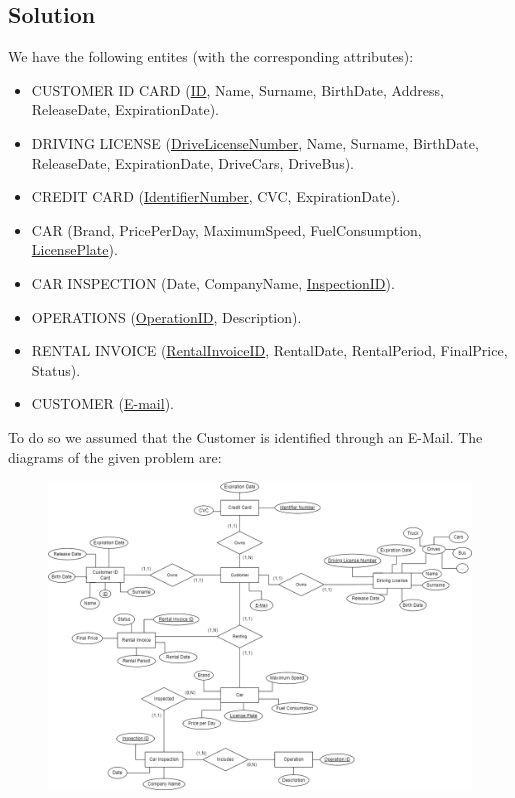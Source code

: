 \subsection{Solution}
We have the following entites (with the corresponding attributes): 
\begin{itemize}
    \item CUSTOMER ID CARD (\underline{ID}, Name, Surname, BirthDate, Address, ReleaseDate, ExpirationDate). 
    \item DRIVING LICENSE (\underline{DriveLicenseNumber}, Name, Surname, BirthDate, ReleaseDate, ExpirationDate, DriveCars, DriveBus). 
    \item CREDIT CARD (\underline{IdentifierNumber}, CVC, ExpirationDate).
    \item CAR (Brand, PricePerDay, MaximumSpeed, FuelConsumption, \underline{LicensePlate}).
    \item CAR INSPECTION (Date, CompanyName, \underline{InspectionID}).
    \item OPERATIONS (\underline{OperationID}, Description). 
    \item RENTAL INVOICE (\underline{RentalInvoiceID}, RentalDate, RentalPeriod, FinalPrice, Status).
    \item CUSTOMER (\underline{E-mail}).
\end{itemize}
To do so we assumed that the Customer is identified through an E-Mail. 
The diagrams of the given problem are: 
\begin{figure}[H]
    \centering
    \includegraphics[width=1.00\linewidth]{images/er.png}
\end{figure}